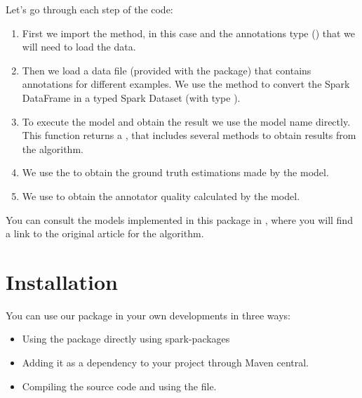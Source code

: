 \documentclass[letterpaper,10pt,english]{sphinxmanual}
\begin{document}
Let’s go through each step of the code:
\begin{enumerate}
\def\theenumi{\arabic{enumi}}
\def\labelenumi{\theenumi .}
\makeatletter\def\p@enumii{\p@enumi \theenumi .}\makeatother
\item {} 
First we import the method, in this case  and the annotations type () that
we will need to load the data.

\item {} 
Then we load a data file (provided with the package) that contains annotations for different examples. We use
the method  to convert the Spark DataFrame in a typed Spark Dataset (with type ).

\item {} 
To execute the model and obtain the result we use the model name directly.
This function returns a , that includes several methods to obtain results from the algorithm.

\item {} 
We use the   to obtain the ground truth estimations made by the model.

\item {} 
We use  to obtain the annotator quality calculated by the model.

\end{enumerate}

You can consult the models implemented in this package in {\hyperref[\detokenize{package/methods:methods}]{}}, where you will find a link to the
original article for the algorithm.


\chapter{Installation}
\label{\detokenize{usage/installation:installation}}\label{\detokenize{usage/installation:id1}}\label{\detokenize{usage/installation::doc}}
You can use our package in your own developments in three ways:
\begin{itemize}
\item {} 
Using the package directly using spark-packages

\item {} 
Adding it as a dependency to your project through Maven central.

\item {} 
Compiling the source code and using the  file.

\end{itemize}
\end{document}
